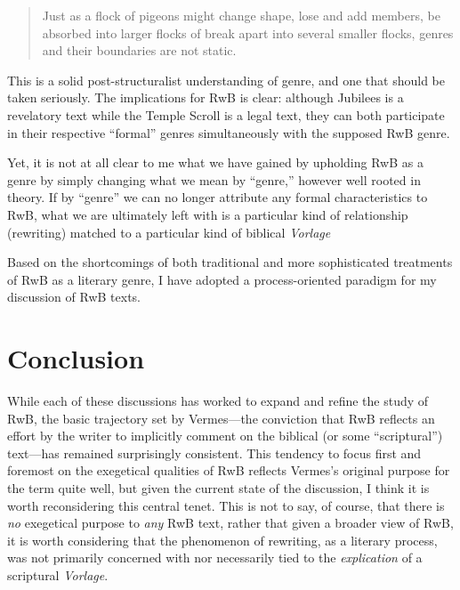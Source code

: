 \begin{quote}
Just as a flock of pigeons might change shape, lose and add members, be
absorbed into larger flocks of break apart into several smaller flocks,
genres and their boundaries are not static.\autocite[277]{zahn_jbl2012}
\end{quote}

This is a solid post-structuralist understanding of genre, and one that
should be taken seriously. The implications for RwB is clear: although
Jubilees is a revelatory text while the Temple Scroll is a legal text,
they can both participate in their respective ``formal'' genres
simultaneously with the supposed RwB genre.\autocites[Zahn also explores
the ``functional'' aspects of genre. She notes that genres are ``not
simply systems of classifications developed and used by literary
critics, but are fundamental to all human
communication.''][280]{zahn_jbl2012}[Thus, genres manifest as common
patterns recognized by both the author and the reader which aid
communication and in this way, genre functions as a sort of ``literary
body language.''][276]{zahn_jbl2012}[See also][199]{newsom_grossman2010}

Yet, it is not at all clear to me what we have gained by upholding RwB
as a genre by simply changing what we mean by ``genre,'' however well
rooted in theory.\autocite[Machiela critiques Zahn's approach for
similar reasons. See][]{machiela_jjs2010} If by ``genre'' we can no
longer attribute any formal characteristics to RwB, what we are
ultimately left with is a particular kind of relationship (rewriting)
matched to a particular kind of biblical \emph{Vorlage}

Based on the shortcomings of both traditional and more sophisticated
treatments of RwB as a literary genre, I have adopted a process-oriented
paradigm for my discussion of RwB texts.\autocite[I am in broad
agreement with Campbell's treatment of the matter.
See][64--67]{campbell_zsengeller2014}

\hypertarget{conclusion}{%
\section{Conclusion}\label{conclusion}}

While each of these discussions has worked to expand and refine the
study of RwB, the basic trajectory set by Vermes---the conviction that
RwB reflects an effort by the writer to implicitly comment on the
biblical (or some ``scriptural'') text---has remained surprisingly
consistent. This tendency to focus first and foremost on the exegetical
qualities of RwB reflects Vermes's original purpose for the term quite
well, but given the current state of the discussion, I think it is worth
reconsidering this central tenet. This is not to say, of course, that
there is \emph{no} exegetical purpose to \emph{any} RwB text, rather
that given a broader view of RwB, it is worth considering that the
phenomenon of rewriting, as a literary process, was not primarily
concerned with nor necessarily tied to the \emph{explication} of a
scriptural \emph{Vorlage}.

